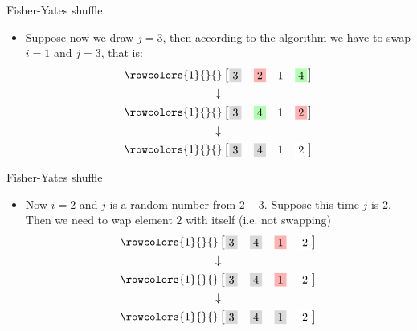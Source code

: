 \documentclass[10pt,xcolor={table,dvipsnames},t]{beamer}
\begin{document}
\begin{frame}{Fisher-Yates shuffle}
  \begin{itemize}
    \item Suppose now we draw $j=3$, then according to the algorithm we have to swap $i=1$ and $j=3$, that is:
    \begin{gather*}
      \rowcolors{1}{}{}
      \begin{bmatrix}
        \fcolorbox{black!0}{gray!30}{$3$} & \fcolorbox{black!0}{red!30}{$2$} & 1 & \fcolorbox{black!0}{green!30}{$4$}
      \end{bmatrix}\\
      \downarrow\\
      \rowcolors{1}{}{}
      \begin{bmatrix}
        \fcolorbox{black!0}{gray!30}{$3$} & \fcolorbox{black!0}{green!30}{$4$} & 1 & \fcolorbox{black!0}{red!30}{$2$}
      \end{bmatrix}\\
      \downarrow\\
      \rowcolors{1}{}{}
      \begin{bmatrix}
        \fcolorbox{black!0}{gray!30}{$3$} & \fcolorbox{black!0}{gray!30}{$4$} & 1 & \fcolorbox{black!0}{red!0}{$2$}
      \end{bmatrix}
    \end{gather*}
  \end{itemize}
\end{frame}

\begin{frame}{Fisher-Yates shuffle}
  \begin{itemize}
    \item Now $i=2$ and $j$ is a random number from $2-3$. Suppose this time $j$ is $2$. Then we need to wap element $2$ with itself (i.e. not swapping)
    \begin{gather*}
      \rowcolors{1}{}{}
      \begin{bmatrix}
        \fcolorbox{black!0}{gray!30}{$3$} & \fcolorbox{black!0}{gray!30}{$4$} & \fcolorbox{black!0}{red!30}{$1$} & \fcolorbox{black!0}{red!0}{$2$}
      \end{bmatrix}\\
      \downarrow\\
      \rowcolors{1}{}{}
      \begin{bmatrix}
        \fcolorbox{black!0}{gray!30}{$3$} & \fcolorbox{black!0}{gray!30}{$4$} & \fcolorbox{black!0}{red!30}{$1$} & \fcolorbox{black!0}{red!0}{$2$}
      \end{bmatrix}\\
      \downarrow\\
      \rowcolors{1}{}{}
      \begin{bmatrix}
        \fcolorbox{black!0}{gray!30}{$3$} & \fcolorbox{black!0}{gray!30}{$4$} & \fcolorbox{black!0}{gray!30}{$1$} & \fcolorbox{black!0}{red!0}{$2$}
      \end{bmatrix}
    \end{gather*}
  \end{itemize}
\end{frame}
\end{document}
